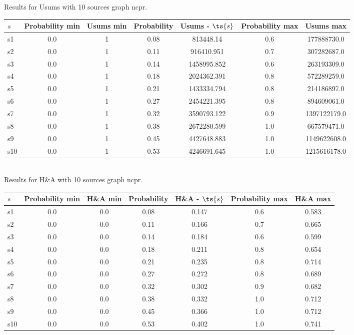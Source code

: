 \documentclass{article}
\begin{document}
\noindent Results for Usums with 10 sources graph ncpr.

\noindent\begin{tabular}{|l|c|c|c|c|c|c|}
\hline
$s$& Probability min & Usums min & Probability & Usums - $\ts{s}$ & Probability max & Usums max\\
\hline
s1 &0.0 & 1 & 0.08 & 813448.14 & 0.6 & 177888730.0\\
\hline
s2 &0.0 & 1 & 0.11 & 916410.951 & 0.7 & 307282687.0\\
\hline
s3 &0.0 & 1 & 0.14 & 1458995.852 & 0.6 & 263193309.0\\
\hline
s4 &0.0 & 1 & 0.18 & 2024362.391 & 0.8 & 572289259.0\\
\hline
s5 &0.0 & 1 & 0.21 & 1433334.794 & 0.8 & 214186897.0\\
\hline
s6 &0.0 & 1 & 0.27 & 2454221.395 & 0.8 & 894609061.0\\
\hline
s7 &0.0 & 1 & 0.32 & 3590793.122 & 0.9 & 1397122179.0\\
\hline
s8 &0.0 & 1 & 0.38 & 2672280.599 & 1.0 & 667579471.0\\
\hline
s9 &0.0 & 1 & 0.45 & 4427648.883 & 1.0 & 1149622608.0\\
\hline
s10 &0.0 & 1 & 0.53 & 4246691.645 & 1.0 & 1215616178.0\\
\hline
\end{tabular}\\

\noindent Results for H\&A with 10 sources graph ncpr.

\noindent\begin{tabular}{|l|c|c|c|c|c|c|}
\hline
$s$& Probability min & H\&A min & Probability & H\&A - $\ts{s}$ & Probability max & H\&A max\\
\hline
s1 &0.0 & 0.0 & 0.08 & 0.147 & 0.6 & 0.583\\
\hline
s2 &0.0 & 0.0 & 0.11 & 0.166 & 0.7 & 0.665\\
\hline
s3 &0.0 & 0.0 & 0.14 & 0.184 & 0.6 & 0.599\\
\hline
s4 &0.0 & 0.0 & 0.18 & 0.211 & 0.8 & 0.654\\
\hline
s5 &0.0 & 0.0 & 0.21 & 0.235 & 0.8 & 0.714\\
\hline
s6 &0.0 & 0.0 & 0.27 & 0.272 & 0.8 & 0.689\\
\hline
s7 &0.0 & 0.0 & 0.32 & 0.302 & 0.9 & 0.682\\
\hline
s8 &0.0 & 0.0 & 0.38 & 0.332 & 1.0 & 0.712\\
\hline
s9 &0.0 & 0.0 & 0.45 & 0.366 & 1.0 & 0.712\\
\hline
s10 &0.0 & 0.0 & 0.53 & 0.402 & 1.0 & 0.741\\
\hline
\end{tabular}\\
\end{document}
